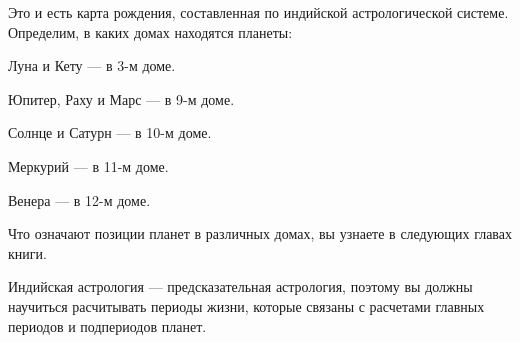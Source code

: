 Это и есть карта рождения, составленная по индийской астрологической системе. Определим, в каких домах находятся планеты:

\begin{mylist}
	\item Луна и Кету --- в 3-м доме.
	\item Юпитер, Раху и Марс --- в 9-м доме.
	\item Солнце и Сатурн --- в 10-м доме.
	\item Меркурий --- в 11-м доме.
	\item Венера --- в 12-м доме.
\end{mylist}

Что означают позиции планет в различных домах, вы узнаете в следующих главах книги.

Индийская астрология --- предсказательная астрология, поэтому вы должны научиться расчитывать периоды жизни, которые связаны с расчетами главных периодов и подпериодов планет.
